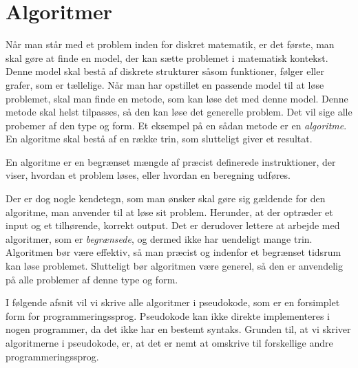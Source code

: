 \chapter{Algoritmer} \label{kap.algo}
Når man står med et problem inden for diskret matematik, er det første, man skal gøre at finde en model, der kan sætte problemet i matematisk kontekst. Denne model skal bestå af diskrete strukturer såsom funktioner, følger eller grafer, som er tællelige. Når man har opstillet en passende model til at løse problemet, skal man finde en metode, som kan løse det med denne model. Denne metode skal helst tilpasses, så den kan løse det generelle problem. Det vil sige alle probemer af den type og form. Et eksempel på en sådan metode er en \emph{algoritme}. En algoritme skal bestå af en række trin, som slutteligt giver et resultat. 
\begin{defn}
[Algoritmer] En algoritme er en begrænset mængde af præcist definerede instruktioner, der viser, hvordan et problem løses, eller hvordan en beregning udføres. 
\end{defn}

Der er dog nogle kendetegn, som man ønsker skal gøre sig gældende for den algoritme, man anvender til at løse sit problem. Herunder, at der optræder et input og et tilhørende, korrekt output. Det er derudover lettere at arbejde med algoritmer, som er \emph{begrænsede}, og dermed ikke har uendeligt mange trin. Algoritmen bør være effektiv, så man præcist og indenfor et begrænset tidsrum kan løse problemet. Slutteligt bør algoritmen være generel, så den er anvendelig på alle problemer af denne type og form.

I følgende afsnit vil vi skrive alle algoritmer i pseudokode, som er en forsimplet form for programmeringssprog. Pseudokode kan ikke direkte implementeres i nogen programmer, da det ikke har en bestemt syntaks. Grunden til, at vi skriver algoritmerne i pseudokode, er, at det er nemt at omskrive til forskellige andre programmeringssprog.






